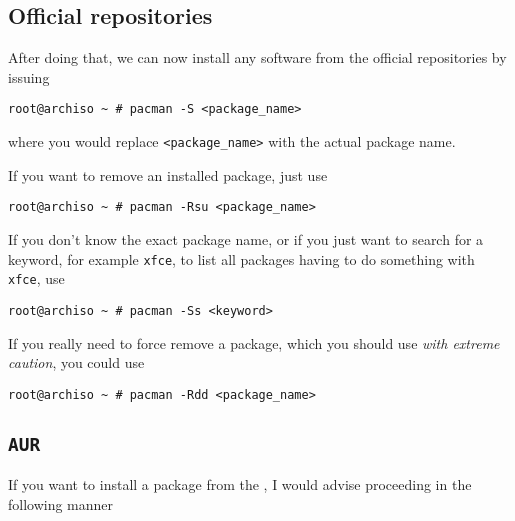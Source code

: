 \documentclass[10pt]{dustdoc}
\begin{document}
\subsection{Official repositories}
\label{sec:official-repositories}

After doing that, we can now install any software from the official repositories by issuing

\begin{verbatim}
root@archiso ~ # pacman -S <package_name>
\end{verbatim}

\noindent
where you would replace \texttt{<package\_name>} with the actual package name.

If you want to remove an installed package, just use

\begin{verbatim}
root@archiso ~ # pacman -Rsu <package_name>
\end{verbatim}

If you don’t know the exact package name, or if you just want to search for a keyword, for example \texttt{xfce}, to list all packages having to do something with \texttt{xfce}, use

\begin{verbatim}
root@archiso ~ # pacman -Ss <keyword>
\end{verbatim}

\begin{CAUTION}
    If you really need to force remove a package, which you should use \emph{with extreme caution}, you could use

    \begin{verbatim}
root@archiso ~ # pacman -Rdd <package_name>
    \end{verbatim}
\end{CAUTION}

\subsection{\texttt{AUR}}
\label{sec:aur}

If you want to install a package from the , I would advise proceeding in the following manner
\end{document}
